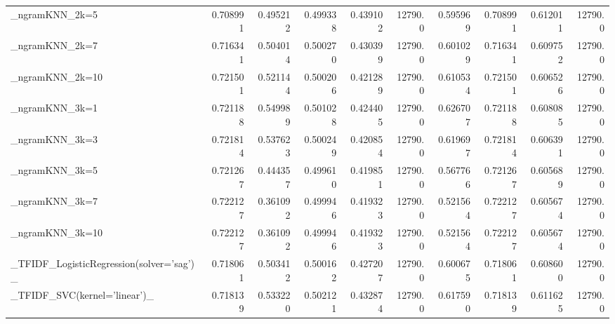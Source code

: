 \begin{tabular}{lrrrrrrrrr}
\_ngramKNN\_2k=5                                     &  0.708991 &         0.495212 &      0.499338 &        0.439102 &        12790.0 &            0.595969 &         0.708991 &           0.612011 &           12790.0 \\
\_ngramKNN\_2k=7                                     &  0.716341 &         0.504014 &      0.500270 &        0.430399 &        12790.0 &            0.601029 &         0.716341 &           0.609752 &           12790.0 \\
\_ngramKNN\_2k=10                                    &  0.721501 &         0.521144 &      0.500206 &        0.421289 &        12790.0 &            0.610534 &         0.721501 &           0.606526 &           12790.0 \\
\_ngramKNN\_3k=1                                     &  0.721188 &         0.549989 &      0.501028 &        0.424405 &        12790.0 &            0.626707 &         0.721188 &           0.608085 &           12790.0 \\
\_ngramKNN\_3k=3                                     &  0.721814 &         0.537623 &      0.500249 &        0.420854 &        12790.0 &            0.619697 &         0.721814 &           0.606391 &           12790.0 \\
\_ngramKNN\_3k=5                                     &  0.721267 &         0.444357 &      0.499610 &        0.419851 &        12790.0 &            0.567766 &         0.721267 &           0.605689 &           12790.0 \\
\_ngramKNN\_3k=7                                     &  0.722127 &         0.361092 &      0.499946 &        0.419323 &        12790.0 &            0.521564 &         0.722127 &           0.605674 &           12790.0 \\
\_ngramKNN\_3k=10                                    &  0.722127 &         0.361092 &      0.499946 &        0.419323 &        12790.0 &            0.521564 &         0.722127 &           0.605674 &           12790.0 \\
\_TFIDF\_LogisticRegression(solver='sag')\_           &  0.718061 &         0.503412 &      0.500162 &        0.427207 &        12790.0 &            0.600675 &         0.718061 &           0.608600 &           12790.0 \\
\_TFIDF\_SVC(kernel='linear')\_                       &  0.718139 &         0.533220 &      0.502121 &        0.432874 &        12790.0 &            0.617590 &         0.718139 &           0.611625 &           12790.0 \\

\end{tabular}
